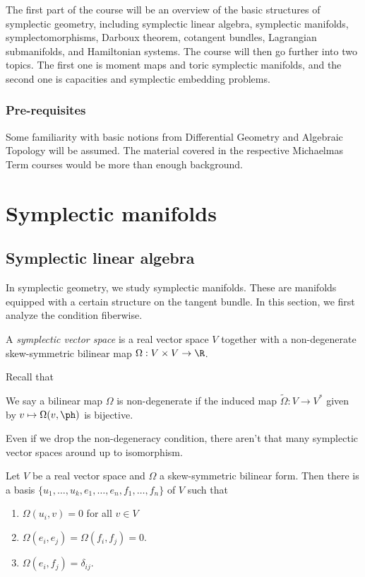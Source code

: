 \documentclass[a4paper]{article}
\begin{document}
\maketitle
{\small
\setlength{\parindent}{0em}
\setlength{\parskip}{1em}
The first part of the course will be an overview of the basic structures of symplectic geometry, including symplectic linear algebra, symplectic manifolds, symplectomorphisms, Darboux theorem, cotangent bundles, Lagrangian submanifolds, and Hamiltonian systems. The course will then go further into two topics. The first one is moment maps and toric symplectic manifolds, and the second one is capacities and symplectic embedding problems.

\subsubsection*{Pre-requisites}
Some familiarity with basic notions from Differential Geometry and Algebraic Topology will be assumed. The material covered in the respective Michaelmas Term courses would be more than enough background.
}
\tableofcontents
\section{Symplectic manifolds}
\subsection{Symplectic linear algebra}
In symplectic geometry, we study symplectic manifolds. These are manifolds equipped with a certain structure on the tangent bundle. In this section, we first analyze the condition fiberwise.

\begin{defi}
  A \emph{symplectic vector space} is a real vector space $V$ together with a non-degenerate skew-symmetric bilinear map $\Omega: V \times V \to \R$.
\end{defi}

Recall that
\begin{defi}
  We say a bilinear map $\Omega$ is non-degenerate if the induced map $\tilde{\Omega}: V \to V^*$ given by $v \mapsto \Omega(v, \ph)$ is bijective.
\end{defi}

Even if we drop the non-degeneracy condition, there aren't that many symplectic vector spaces around up to isomorphism.
\begin{thm}
  Let $V$ be a real vector space and $\Omega$ a skew-symmetric bilinear form. Then there is a basis $\{u_1, \ldots, u_k, e_1, \ldots, e_n, f_1, \ldots, f_n\}$ of $V$ such that
  \begin{enumerate}
    \item $\Omega(u_i, v) = 0$ for all $v \in V$
    \item $\Omega(e_i, e_j) = \Omega(f_i, f_j) = 0$.
    \item $\Omega(e_i, f_j) = \delta_{ij}$.
  \end{enumerate}
\end{thm}
\end{document}
